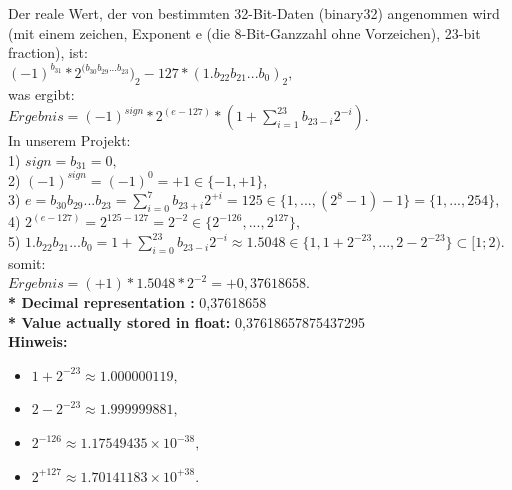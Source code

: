 \documentclass[a4paper]{report}
\begin{document}
Der reale Wert, der von bestimmten 32-Bit-Daten (binary32) angenommen wird (mit einem zeichen, Exponent e (die 8-Bit-Ganzzahl ohne Vorzeichen),  23-bit fraction), ist:\\

$(-1)^{b_{31}}  *  2^{(b_{30} b_{29} ... b_{23}})_{2} - 127  *   (1.b_{22} b_{21} ... b_{0})_{2} ,$\\

was ergibt:\\


$ Ergebnis = (-1)^{sign}  *  2^{(e-127)}  *  (1 +  \sum_{i=1}^{23} b_{23-i}2^{-i}) . $\\

In unserem Projekt:\\

1)   $sign = b_{31} = 0,$\\

2)   $(-1)^{sign} = (-1)^{0} = +1 \in \{ -1, +1\} ,$\\

3)   $ e = b_{30} b_{29} ... b_{23} = \sum_{i=0}^{7} b_{23+i}2^{+i} = 125 \in \{ 1, ... ,(2^{8}-1)-1\} = \{1,...,254 \} , $\\

4)   $2^{(e-127)} = 2^{125-127} = 2^{-2} \in \{ 2^{-126}, ... , 2^{127}\} , $\\

5)   $1.b_{22}b_{21} ... b_{0} = 1 + \sum_{i=0}^{23} b_{23-i}2^{-i} \approx  1.5048 \in \{ 1,1+2^{-23}, ... ,2 - 2^{-23}\} \subset [1;2).$\\

somit:\\

$Ergebnis = (+1) * 1.5048 * 2^{-2} = +0,37618658. $\\

\textbf{* Decimal representation :} 0,37618658\\

\textbf{* Value actually stored in float:} 0,37618657875437295\\


\textbf{Hinweis:}
	\begin{itemize}
		\item $1 + 2^{-23} \approx 1.000 000 119 ,$
		\item $2 - 2^{-23} \approx 1.999 999 881 ,$
		\item $2^{-126} \approx 1.175 494 35 \times 10^{-38} ,$
		\item $2^{+127} \approx 1.701 411 83 \times 10^{+38} .$
	\end{itemize}
\end{document}
